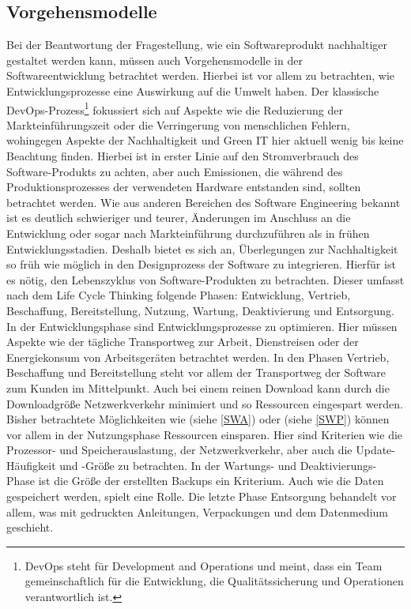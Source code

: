 \documentclass[utf8,biblatex]{lni}
\begin{document}
\subsection{Vorgehensmodelle}
Bei der Beantwortung der Fragestellung, wie ein Softwareprodukt nachhaltiger gestaltet werden kann, müssen auch Vorgehensmodelle in der Softwareentwicklung betrachtet werden. Hierbei ist vor allem zu betrachten, wie Entwicklungsprozesse eine Auswirkung auf die Umwelt haben. Der klassische DevOps-Prozess\footnote{DevOps steht für Development and Operations und meint, dass ein Team gemeinschaftlich für die Entwicklung, die Qualitätssicherung und Operationen verantwortlich ist.} fokussiert sich auf Aspekte wie die Reduzierung der Markteinführungszeit oder die Verringerung von menschlichen Fehlern, wohingegen Aspekte der Nachhaltigkeit und Green IT hier aktuell wenig bis keine Beachtung finden. \cite{Brode22} 
\newline
Hierbei ist in erster Linie auf den Stromverbrauch des Software-Produkts zu achten, aber auch Emissionen, die während des Produktionsprozesses der verwendeten Hardware entstanden sind, sollten betrachtet werden.
\newline
Wie aus anderen Bereichen des Software Engineering bekannt ist es deutlich schwieriger und teurer, Änderungen im Anschluss an die Entwicklung oder sogar nach Markteinführung durchzuführen als in frühen Entwicklungsstadien. Deshalb bietet es sich an, Überlegungen zur Nachhaltigkeit so früh wie möglich in den Designprozess der Software zu integrieren. \cite{Dick13}
\newline
Hierfür ist es nötig, den Lebenszyklus von Software-Produkten zu betrachten. Dieser umfasst nach dem \glqq Life Cycle Thinking\grqq{} folgende Phasen: Entwicklung, Vertrieb, Beschaffung, Bereitstellung, Nutzung, Wartung, Deaktivierung und Entsorgung. \cite{Dick10} \newline
In der Entwicklungsphase sind Entwicklungsprozesse zu optimieren. Hier müssen Aspekte wie der tägliche Transportweg zur Arbeit, Dienstreisen oder der Energiekonsum von Arbeitsgeräten betrachtet werden. In den Phasen Vertrieb, Beschaffung und Bereitstellung steht vor allem der Transportweg der Software zum Kunden im Mittelpunkt. Auch bei einem reinen Download kann durch die Downloadgröße Netzwerkverkehr minimiert und so Ressourcen eingespart werden. Bisher betrachtete Möglichkeiten wie  (siehe \autoref{SWA}) oder  (siehe \autoref{SWP}) können vor allem in der Nutzungsphase Ressourcen einsparen. Hier sind Kriterien wie die Prozessor- und Speicherauslastung, der Netzwerkverkehr, aber auch die Update-Häufigkeit und -Größe zu betrachten. In der Wartungs- und Deaktivierungs-Phase ist die Größe der erstellten Backups ein Kriterium. Auch wie die Daten gespeichert werden, spielt eine Rolle. Die letzte Phase Entsorgung behandelt vor allem, was mit gedruckten Anleitungen, Verpackungen und dem Datenmedium geschieht. \cite{Dick10} \cite{Johann11}
\end{document}
